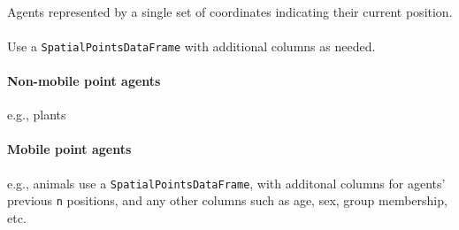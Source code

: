 \documentclass{article}
\begin{document}
\paragraph{}
Agents represented by a single set of coordinates indicating their current position.

\paragraph{}
Use a \texttt{SpatialPointsDataFrame} with additional columns as needed.

\paragraph{Non-mobile point agents}
e.g., plants

\paragraph{Mobile point agents}
e.g., animals use a \texttt{SpatialPointsDataFrame}, with additonal columns for agents' previous \texttt{n} positions, and any other columns such as age, sex, group membership, etc.
\end{document}
